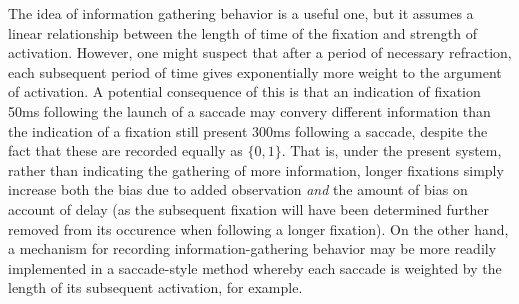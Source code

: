 \documentclass{article}
\begin{document}
The idea of information gathering behavior is a useful one, but it assumes a linear relationship between the length of time of the fixation and strength of activation. However, one might suspect that after a period of necessary refraction, each subsequent period of time gives exponentially more weight to the argument of activation. A potential consequence of this is that an indication of fixation 50ms following the launch of a saccade may convery different information than the indication of a fixation still present 300ms following a saccade, despite the fact that these are recorded equally as $\{0,1\}$. That is, under the present system, rather than indicating the gathering of more information, longer fixations simply increase both the bias due to added observation \textit{and} the amount of bias on account of delay (as the subsequent fixation will have been determined further removed from its occurence when following a longer fixation). On the other hand, a mechanism for recording information-gathering behavior may be more readily implemented in a saccade-style method whereby each saccade is weighted by the length of its subsequent activation, for example.
\end{document}
